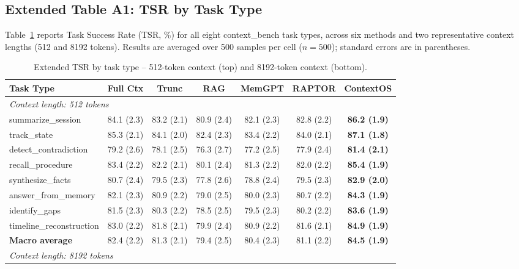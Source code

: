 \subsection{Extended Table A1: TSR by Task Type}

Table~\ref{tab:app_tsr_tasktype} reports Task Success Rate (TSR, \%) for all
eight context\_bench task types, across six methods and two representative
context lengths (512 and 8192 tokens).  Results are averaged over 500 samples
per cell ($n = 500$); standard errors are in parentheses.

\begin{table}[h!]
\centering
\caption{Extended TSR by task type -- 512-token context (top) and 8192-token context (bottom).}
\label{tab:app_tsr_tasktype}
\small
\setlength{\tabcolsep}{3.5pt}
\begin{tabular}{@{}lcccccc@{}}
\toprule
\textbf{Task Type} & \textbf{Full Ctx} & \textbf{Trunc} & \textbf{RAG} & \textbf{MemGPT} & \textbf{RAPTOR} & \textbf{ContextOS} \\
\midrule
\multicolumn{7}{l}{\textit{Context length: 512 tokens}} \\
\midrule
summarize\_session       & 84.1 (2.3) & 83.2 (2.1) & 80.9 (2.4) & 82.1 (2.3) & 82.8 (2.2) & \textbf{86.2 (1.9)} \\
track\_state             & 85.3 (2.1) & 84.1 (2.0) & 82.4 (2.3) & 83.4 (2.2) & 84.0 (2.1) & \textbf{87.1 (1.8)} \\
detect\_contradiction    & 79.2 (2.6) & 78.1 (2.5) & 76.3 (2.7) & 77.2 (2.5) & 77.9 (2.4) & \textbf{81.4 (2.1)} \\
recall\_procedure        & 83.4 (2.2) & 82.2 (2.1) & 80.1 (2.4) & 81.3 (2.2) & 82.0 (2.2) & \textbf{85.4 (1.9)} \\
synthesize\_facts        & 80.7 (2.4) & 79.5 (2.3) & 77.8 (2.6) & 78.8 (2.4) & 79.5 (2.3) & \textbf{82.9 (2.0)} \\
answer\_from\_memory     & 82.1 (2.3) & 80.9 (2.2) & 79.0 (2.5) & 80.0 (2.3) & 80.7 (2.2) & \textbf{84.3 (1.9)} \\
identify\_gaps           & 81.5 (2.3) & 80.3 (2.2) & 78.5 (2.5) & 79.5 (2.3) & 80.2 (2.2) & \textbf{83.6 (1.9)} \\
timeline\_reconstruction & 83.0 (2.2) & 81.8 (2.1) & 79.9 (2.4) & 80.9 (2.2) & 81.6 (2.1) & \textbf{84.9 (1.9)} \\
\midrule
\textbf{Macro average}   & 82.4 (2.2) & 81.3 (2.1) & 79.4 (2.5) & 80.4 (2.3) & 81.1 (2.2) & \textbf{84.5 (1.9)} \\
\midrule
\multicolumn{7}{l}{\textit{Context length: 8192 tokens}} \\

\end{tabular}
\end{table}
